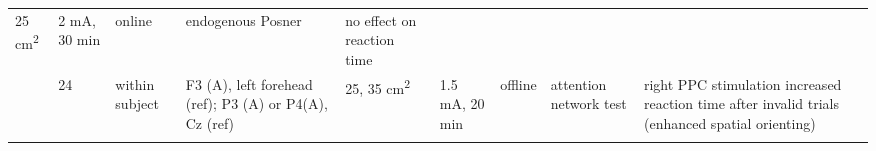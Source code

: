 \documentclass[11pt,]{memoir}
\begin{document}
\begin{longtable}[]{@{}lllllllll@{}}
\begin{minipage}[t]{0.03\columnwidth}
25
cm\textsuperscript{2}\strut
\end{minipage} & \begin{minipage}[t]{0.05\columnwidth}\raggedright
2 mA, 30
min\strut
\end{minipage} & \begin{minipage}[t]{0.05\columnwidth}\raggedright
online\strut
\end{minipage} & \begin{minipage}[t]{0.11\columnwidth}\raggedright
endogenous Posner\strut
\end{minipage} & \begin{minipage}[t]{0.24\columnwidth}\raggedright
no effect on reaction time\strut
\end{minipage}\tabularnewline
\begin{minipage}[t]{0.12\columnwidth}\raggedright
\textcite{Roy2015}\strut
\end{minipage} & \begin{minipage}[t]{0.02\columnwidth}\raggedright
24\strut
\end{minipage} & \begin{minipage}[t]{0.04\columnwidth}\raggedright
within
subject\strut
\end{minipage} & \begin{minipage}[t]{0.11\columnwidth}\raggedright
F3 (A), left forehead
(ref); P3 (A) or P4(A),
Cz (ref)\strut
\end{minipage} & \begin{minipage}[t]{0.03\columnwidth}\raggedright
25,
35
cm\textsuperscript{2}\strut
\end{minipage} & \begin{minipage}[t]{0.05\columnwidth}\raggedright
1.5 mA, 20
min\strut
\end{minipage} & \begin{minipage}[t]{0.05\columnwidth}\raggedright
offline\strut
\end{minipage} & \begin{minipage}[t]{0.11\columnwidth}\raggedright
attention network test\strut
\end{minipage} & \begin{minipage}[t]{0.24\columnwidth}\raggedright
right PPC stimulation increased reaction time after invalid
trials (enhanced spatial orienting)\strut
\end{minipage}\tabularnewline
\begin{minipage}[t]{0.12\columnwidth}\raggedright
\textcite{Coffman2012}\strut
\end{minipage} & \begin{minipage}[t]{0.02\columnwidth}\raggedright

\end{minipage}
\end{longtable}
\end{document}
